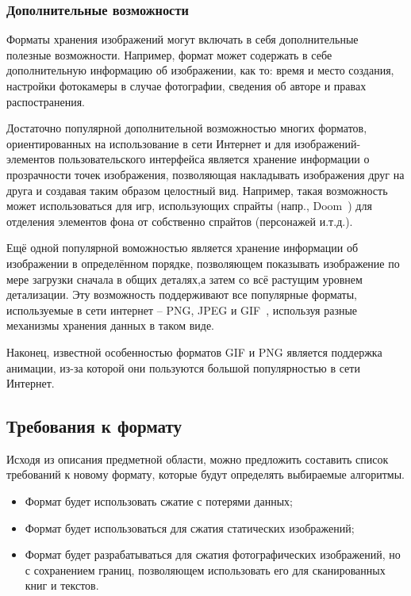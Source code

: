 \documentclass[a4paper,12pt]{article}
\numberwithin{equation}{section}
\begin{document}
\subsubsection{Дополнительные возможности}

Форматы хранения изображений могут включать в себя дополнительные полезные
возможности. Например, формат может содержать в себе дополнительную информацию
об изображении, как то: время и место создания, настройки фотокамеры в случае
фотографии, сведения об авторе и правах распостранения.

Достаточно популярной дополнительной возможностью многих форматов,
ориентированных на использование в сети Интернет и для изображений-элементов
пользовательского интерфейса является хранение информации о прозрачности точек
изображения, позволяющая накладывать изображения друг на друга и создавая таким
образом целостный вид. Например, такая возможность может использоваться для игр,
использующих спрайты (напр., Doom~\cite{wiki:doom}) для отделения элементов фона
от собственно спрайтов (персонажей и.т.д.).

Ещё одной популярной воможностью является хранение информации об изображении в
определённом порядке, позволяющем показывать изображение по мере загрузки
сначала в общих деталях,а затем со всё растущим уровнем детализации. Эту
возможность поддерживают все популярные форматы, используемые в сети интернет --
PNG, JPEG и GIF~\cite{png}\cite{jpeg}\cite{gif}, используя разные механизмы
хранения данных в таком виде.

Наконец, известной особенностью форматов GIF и PNG является поддержка анимации,
из-за которой они пользуются большой популярностью в сети Интернет.

\subsection{Требования к формату}

Исходя из описания предметной области, можно предложить составить список
требований к новому формату, которые будут определять выбираемые алгоритмы.

\begin{itemize}
\item Формат будет использовать сжатие с потерями данных;
\item Формат будет использоваться для сжатия статических изображений;
\item Формат будет разрабатываться для сжатия фотографических изображений, но с
  сохранением границ, позволяющем использовать его для сканированных книг и текстов.
\end{itemize}
\end{document}
